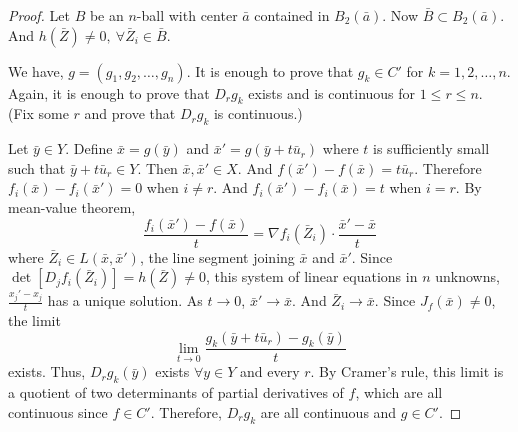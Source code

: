 \begin{proof}
Let $B$ be an $n$-ball with center $\bar{a}$ contained in $B_2(\bar{a})$.
Now $\bar{B} \subset B_2(\bar{a})$.
And $h(\bar{Z}) \ne 0,\ \forall \bar{Z}_i \in \bar{B}$.

We have, $g = (g_1, g_2, \dots,g_n)$.
It is enough to prove that $g_k \in C'$ for $k=1,2,\dots,n$.
Again, it is enough to prove that $D_rg_k$ exists and is continuous for $1 \le r \le n$.
(Fix some $r$ and prove that $D_rg_k$ is continuous.)

Let $\bar{y} \in Y$.
Define $\bar{x} = g(\bar{y})$ and $\bar{x}' = g(\bar{y}+t\bar{u}_r)$ where $t$ is sufficiently small such that $\bar{y}+t\bar{u}_r \in Y$.
Then $\bar{x},\bar{x}' \in X$.
And $f(\bar{x}')-f(\bar{x}) = t\bar{u}_r$.
Therefore $f_i(\bar{x})-f_i(\bar{x}') = 0$ when $i \ne r$.
And $f_i(\bar{x}')-f_i(\bar{x}) = t$ when $i = r$.
By mean-value theorem,
	\[ \frac{f_i(\bar{x}') - f(\bar{x})}{t} = \nabla f_i(\bar{Z}_i) \cdot \frac{\bar{x}'-\bar{x}}{t} \]
where $\bar{Z}_i \in L(\bar{x},\bar{x}')$, the line segment joining $\bar{x}$ and $\bar{x}'$.
Since $\det[D_jf_i(\bar{Z}_i)] = h(\bar{Z}) \ne 0$, this system of linear equations in $n$ unknowns, $\frac{x_j'-x_j}{t}$ has a unique solution.
As $t \to 0$, $\bar{x}' \to \bar{x}$.
And $\bar{Z}_i \to \bar{x}$.
Since $J_f(\bar{x}) \ne 0$, the limit
	\[ \lim_{t \to 0} \frac{g_k(\bar{y}+t\bar{u}_r)-g_k(\bar{y})}{t} \]
exists.
Thus, $D_rg_k(\bar{y})$ exists $\forall y \in Y$ and every $r$.	
By Cramer's rule, this limit is a quotient of two determinants of partial derivatives of $f$, which are all continuous since $f \in C'$.
Therefore, $D_rg_k$ are all continuous and $g \in C'$.
\end{proof}

